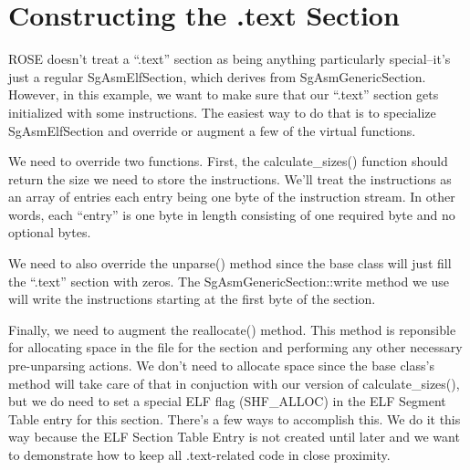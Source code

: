 \section{Constructing the .text Section}

ROSE doesn't treat a ``.text'' section as being anything particularly
special--it's just a regular SgAsmElfSection, which derives from
SgAsmGenericSection. However, in this example, we want to make sure
that our ``.text'' section gets initialized with some
instructions. The easiest way to do that is to specialize
SgAsmElfSection and override or augment a few of the virtual
functions.

We need to override two functions. First, the calculate_sizes()
function should return the size we need to store the
instructions. We'll treat the instructions as an array of entries each
entry being one byte of the instruction stream. In other words, each
``entry'' is one byte in length consisting of one required byte and no
optional bytes.

We need to also override the unparse() method since the base class
will just fill the ``.text'' section with zeros. The
SgAsmGenericSection::write method we use will write the instructions
starting at the first byte of the section.

Finally, we need to augment the reallocate() method. This method is
reponsible for allocating space in the file for the section and
performing any other necessary pre-unparsing actions. We don't need to
allocate space since the base class's method will take care of that in
conjuction with our version of calculate_sizes(), but we do need to
set a special ELF flag (SHF_ALLOC) in the ELF Segment Table entry for
this section. There's a few ways to accomplish this. We do it this way
because the ELF Section Table Entry is not created until later and we
want to demonstrate how to keep all .text-related code in close
proximity.

